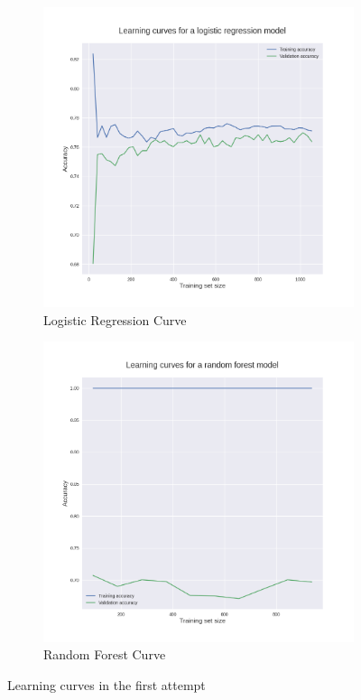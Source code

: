 \documentclass[12pt, conference]{IEEEtran}
\begin{document}
\begin{figure}[t]
    \centering
    \begin{subfigure}[b]{.5\linewidth}
        \centering
        \includegraphics[width=\linewidth]{resources/learning_curve_basic_features_log_regr.png}
        \caption{Logistic Regression Curve}
        \label{fig:learning-curves-first-attempt-randfor}
    \end{subfigure}%
    \begin{subfigure}[b]{.5\linewidth}
        \centering
        \includegraphics[width=\linewidth]{resources/learning_curve_basic_features_rand_for.png}
        \caption{Random Forest Curve}
        \label{fig:learning-curves-first-attempt-logreg}
    \end{subfigure}
    \caption{Learning curves in the first attempt}
    \label{fig:learning-curves-first-attempt}
\end{figure}
\end{document}
